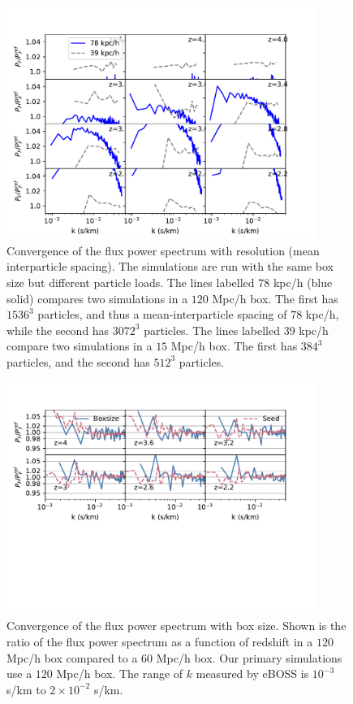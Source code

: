 \documentclass[a4paper,11pt]{article}
\begin{document}
\begin{figure}
\includegraphics[width=0.9\textwidth]{figures/resolution-convergence.pdf}
 \caption{Convergence of the flux power spectrum with resolution (mean interparticle spacing). The simulations are run with the same box size but different particle loads. The lines labelled $78$ kpc/h (blue solid) compares two simulations in a $120$ Mpc/h box. The first has $1536^3$ particles, and thus a mean-interparticle spacing of $78$ kpc/h, while the second has $3072^3$ particles. The lines labelled $39$ kpc/h compare two simulations in a $15$ Mpc/h box. The first has $384^3$ particles, and the second has $512^3$ particles.}
 \label{fig:resolution}
\end{figure}
\begin{figure}
\includegraphics[width=0.9\textwidth]{figures/box-convergence.pdf}
 \caption{Convergence of the flux power spectrum with box size. Shown is the ratio of the flux power spectrum as a function of redshift in a $120$ Mpc/h box compared to a $60$ Mpc/h box. Our primary simulations use a $120$ Mpc/h box. The range of $k$ measured by eBOSS is $10^{-3}$ s/km to $2\times 10^{-2}$ s/km. }
 \label{fig:resolution}
\end{figure}
\end{document}
